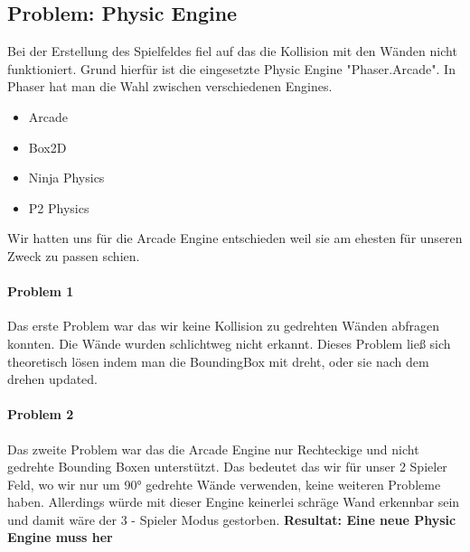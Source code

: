\subsection{Problem: Physic Engine} 
Bei der Erstellung des Spielfeldes fiel auf das die Kollision mit den Wänden nicht funktioniert. Grund hierfür ist die eingesetzte Physic Engine "Phaser.Arcade".
In Phaser hat man die Wahl zwischen verschiedenen Engines.
\begin{itemize}
	\item
	      Arcade
	\item
	      Box2D
	\item
	      Ninja Physics
	\item
	      P2 Physics
\end{itemize}
Wir hatten uns für die Arcade Engine entschieden weil sie am ehesten für unseren Zweck zu passen schien.
\paragraph{Problem 1}
Das erste Problem war das wir keine Kollision zu gedrehten Wänden abfragen konnten. Die Wände wurden schlichtweg nicht erkannt.
Dieses Problem ließ sich theoretisch lösen indem man die BoundingBox mit dreht, oder sie nach dem drehen updated.
\paragraph{Problem 2}
Das zweite Problem war das die Arcade Engine nur Rechteckige und nicht gedrehte Bounding Boxen unterstützt. Das bedeutet das wir für unser 2 Spieler Feld, wo wir nur um 90° gedrehte Wände verwenden, keine weiteren Probleme haben. Allerdings würde mit dieser Engine keinerlei schräge Wand erkennbar sein und damit wäre der 3 - Spieler Modus gestorben.
\newline
\textbf{Resultat: Eine neue Physic Engine muss her}
